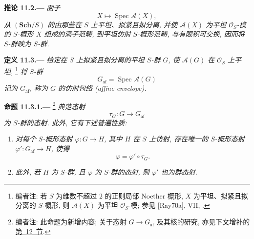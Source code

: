 \medskip
{}\label{cor:sga3-VIB-11.2}%
\noindent\textbf{推论 11.2.---}
\emph{函子}
\[
  X\longmapsto\operatorname{Spec}\mathcal A(X),
\]
\emph{从 \((\mathbf{Sch}/S)\) 的由那些在 \(S\) 上平坦、拟紧且拟分离,
并使 \(\mathcal A(X)\) 为平坦 \(\mathcal O_S\)-模的
\(S\)-概形 \(X\) 组成的满子范畴, 到平坦仿射
\(S\)-概形范畴, 与有限积可交换, 因而将 \(S\)-群映为 \(S\)-群.}

\medskip
{}\label{def:sga3-VIB-11.3}%
\noindent\textbf{定义 11.3.---}
\emph{给定在 \(S\) 上拟紧且拟分离的平坦 \(S\)-群 \(G\),
使 \(\mathcal A(G)\) 在 \(\mathcal O_S\) 上平坦,}%
\footnote{\label{note:sga3-VIB-106}编者注: 若 \(S\) 为维数不超过 \(2\) 的正则局部 Noether 概形,
\(X\) 为平坦、拟紧且拟分离的 \(S\)-概形,
则 \(\mathcal A(X)\) 为平坦 \(\mathcal O_S\)-模;
参见 \textup{[Ray70a]}, VII, .}
\emph{将 \(S\)-群}
\[
  G_{\mathrm{af}}=\operatorname{Spec}\mathcal A(G)
\]
\emph{记为 \(G_{\mathrm{af}}\), 称为 \(G\) 的\emph{仿射包络 (affine envelope)}.}

\medskip
{}\label{prop:sga3-VIB-11.3.1}%
\noindent\textbf{命题 11.3.1.---}%
\footnote{\label{note:sga3-VIB-107}编者注: 此命题为新增内容;
关于态射 \(G\to G_{\mathrm{af}}\) 及其核的研究,
亦见下文增补的\hyperref[sec:sga3-VIB-12]{第~12~节}.}
\emph{典范态射}
\[
  \tau_G:G\longrightarrow G_{\mathrm{af}}
\]
\emph{为 \(S\)-群的态射. 此外, 它有下述普遍性质:}
\begin{enumerate}
\item[\textup{(i)}]\label{concl:sga3-VIB-11.3.1-i}
  \emph{对每个 \(S\)-概形态射 \(\varphi:G\to H\),
其中 \(H\) 在 \(S\) 上仿射, 存在唯一的 \(S\)-概形态射
\(\varphi':G_{\mathrm{af}}\to H\), 使得}
  \[
    \varphi=\varphi'\circ\tau_G.
  \]

\item[\textup{(ii)}]\label{concl:sga3-VIB-11.3.1-ii}
  \emph{此外, 若 \(H\) 为 \(S\)-群, 且 \(\varphi\) 为 \(S\)-群的态射,
则 \(\varphi'\) 也为群态射.}
\end{enumerate}
